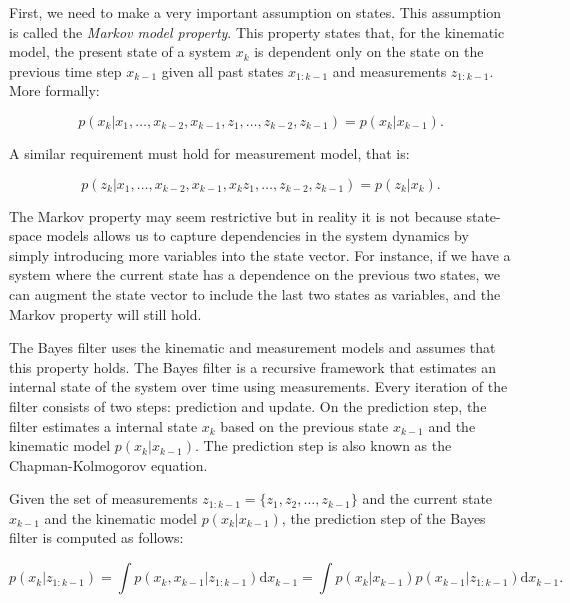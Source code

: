 First, we need to make a very important assumption on states. This assumption
is called the \textit{Markov model property}. This property states that, for 
the kinematic model, the present state of a system $x_k$ is dependent only on 
the state on the previous time step $x_{k-1}$ given all past states $x_{1:k-1}$ 
and measurements $z_{1:k-1}$. More formally:

$$
p(x_k | x_1, \ldots, x_{k-2}, x_{k-1},
        z_1, \ldots, z_{k-2}, z_{k-1}) 
    = p(x_k | x_{k-1}).
$$

A similar requirement must hold for measurement model, that is:

$$
p(z_k | x_1, \ldots, x_{k-2}, x_{k-1}, x_{k}
        z_1, \ldots, z_{k-2}, z_{k-1}) 
    = p(z_k | x_k).
$$

The Markov property may seem restrictive but in reality it is not because state-
space models allows us to capture dependencies in the system dynamics by simply 
introducing more variables into the state vector. For instance, if we have a 
system where the current state has a dependence on the previous two states, we 
can augment the state vector to include the last two states as variables, and 
the Markov property will still hold.

The Bayes filter uses the kinematic and measurement models and assumes that this
property holds. The Bayes filter is a recursive framework that estimates an
internal state of the system over time using measurements. Every iteration of
the filter consists of two steps: prediction and update. On the prediction step,
the filter estimates a internal state $x_k$ based on the previous state
$x_{k-1}$ and the kinematic model $p(x_k | x_{k-1})$. The prediction step
is also known as the Chapman-Kolmogorov equation.

\begin{theorem}
    Given the set of measurements $z_{1:k-1} = \{z_1, z_2, \ldots, z_{k-1}\}$ 
    and the current state $x_{k-1}$ and the kinematic model $p(x_k | x_{k-1})$, 
    the prediction step of the Bayes filter is computed as follows:

    $$
    p\left({x}_k | {z}_{1: k-1}\right)
        = \int 
            p\left(
                {x}_k, {x}_{k-1} | {z}_{1: k-1}
            \right)
            \mathrm{d} {x}_{k-1}
        = \int
            p\left(
                {x}_k | {x}_{k-1}\right
            ) p\left(
                {x}_{k-1} | {z}_{1: k-1}
            \right)
            \mathrm{d} {x}_{k-1}.
    $$
\end{theorem}

